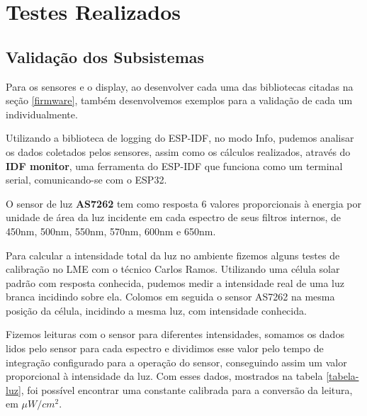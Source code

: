 \documentclass[../monografia.tex]{subfiles}
\begin{document}

\section{Testes Realizados} %

\subsection{Validação dos Subsistemas} %

Para os sensores e o display, ao desenvolver cada uma das bibliotecas citadas na seção \ref{firmware}, também desenvolvemos exemplos para a validação de cada um individualmente. 

Utilizando a biblioteca de logging do ESP-IDF\cite{log-esp}, no modo Info, pudemos analisar os dados coletados pelos sensores, assim como os cálculos realizados, através do \textbf{IDF monitor}, uma ferramenta do ESP-IDF que funciona como um terminal serial, comunicando-se com o ESP32. 




O sensor de luz \textbf{AS7262} tem como resposta 6 valores proporcionais à energia por unidade de área da luz incidente em cada espectro de seus filtros internos, de 450nm, 500nm, 550nm, 570nm, 600nm e 650nm. 

Para calcular a intensidade total da luz no ambiente fizemos alguns testes de calibração no LME com o técnico Carlos Ramos. Utilizando uma célula solar padrão com resposta conhecida, pudemos medir a intensidade real de uma luz branca incidindo sobre ela. Colomos em seguida o sensor AS7262 na mesma posição da célula, incidindo a mesma luz, com intensidade conhecida. 

Fizemos leituras com o sensor para diferentes intensidades, somamos os dados lidos pelo sensor para cada espectro e dividimos esse valor pelo tempo de integração configurado para a operação do sensor, conseguindo assim um valor proporcional à intensidade da luz. 
Com esses dados, mostrados na tabela \ref{tabela-luz}, foi possível encontrar uma constante calibrada para a conversão da leitura, em $\mu W/cm^2$. %
\end{document}
